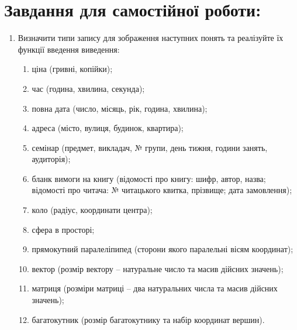 \documentclass[a5paper,titlepage,openany,twoside,draft]{book_unv}%
\makeatletter
\newcommand{\xslalph}[1]{\expandafter\@xslalph\csname c@#1\endcsname}
\newcommand{\@xslalph}[1]{%
    \ifcase#1\or а\or б\or в\or г\or д\or e\or є\or ж\or з\or i%
    \or й\or к\or л\or м\or н\or о\or п\or р\or с\or т%
    \or у\or ф\or х\or ц\or ч\or ш\or ю\or я\or аа\or бб\or вв%
    \else\@ctrerr\fi%
}
\makeatother
\begin{document}
\section{Завдання для самостійної роботи:}

\begin{enumerate}
\def\labelenumi{\arabic{enumi})}
\setcounter{enumi}{5}
\item
 Визначити типи запису для зображення наступних понять та реалізуйте
їх функції введення виведення:
\begin{enumerate}[label=\xslalph*)]
\item ціна (гривні, копійки);
\item час (година, хвилина, секунда);
\item повна дата (число, місяць, рік, година, хвилина);
\item адреса (місто, вулиця, будинок, квартира);
\item семінар (предмет, викладач, № групи, день тижня, години занять, аудиторія);
\item бланк вимоги на книгу (відомості про книгу: шифр, автор, назва;
відомості про читача: № читацького квитка, прізвище; дата замовлення);
\item коло (радіус, координати центра);
\item сфера в просторі;
\item прямокутний паралеліпипед (сторони якого паралельні вісям координат);
\item вектор (розмір вектору -- натуральне число та масив дійсних значень);
\item матриця (розміри матриці -- два натуральних числа та масив дійсних значень);
\item багатокутник (розмір багатокутнику та набір координат вершин).


\end{enumerate}


\end{enumerate}
\end{document}
